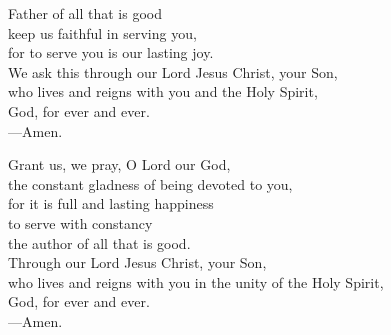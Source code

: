 \prayer


\begin{prayerverse}
Father of all that is good\\
keep us faithful in serving you,\\
for to serve you is our lasting joy.\\
We ask this through our Lord Jesus Christ, your Son,\\
who lives and reigns with you and the Holy Spirit,\\
God, for ever and ever.\\
{\color{red}---\thinspace}Amen.
\end{prayerverse}


\begin{prayerverse}
Grant us, we pray, O Lord our God,\\
the constant gladness of being devoted to you,\\
for it is full and lasting happiness\\
to serve with constancy\\
the author of all that is good.\\
Through our Lord Jesus Christ, your Son,\\
who lives and reigns with you in the unity of the Holy Spirit,\\
God, for ever and ever.\\
{\color{red}---\thinspace}Amen.
\end{prayerverse}

